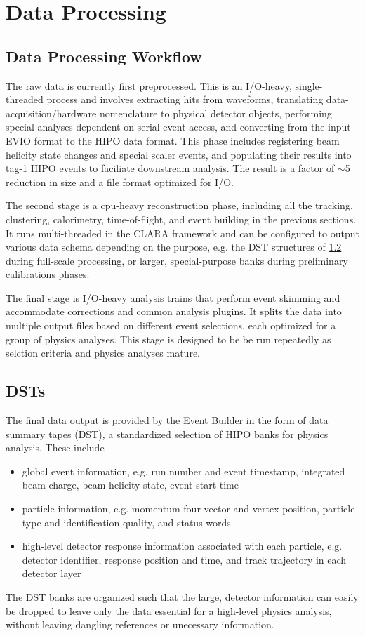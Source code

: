\section{Data Processing}

\subsection{Data Processing Workflow}
The raw data is currently first preprocessed.  This is an I/O-heavy, single-threaded process and involves extracting hits from waveforms, translating data-acquisition/hardware nomenclature to physical detector objects, performing special analyses dependent on serial event access, and converting from the input EVIO format to the HIPO data format.  This phase includes registering beam helicity state changes and special scaler events, and populating their results into tag-1 HIPO events to faciliate downstream analysis.  The result is a factor of $\sim$5 reduction in size and a file format optimized for I/O.

The second stage is a cpu-heavy reconstruction phase, including all the tracking, clustering, calorimetry, time-of-flight, and event building in the previous sections.  It runs multi-threaded in the CLARA framework and can be configured to output various data schema depending on the purpose, e.g. the DST structures of \ref{sec:dsts} during full-scale processing, or larger, special-purpose banks during preliminary calibrations phases.

The final stage is I/O-heavy analysis trains that perform event skimming and accommodate corrections and common analysis plugins.  It splits the data into multiple output files based on different event selections, each optimized for a group of physics analyses.  This stage is designed to be be run repeatedly as selction criteria and physics analyses mature.

\subsection{DSTs}\label{sec:dsts}
The final data output is provided by the Event Builder in the form of data summary tapes (DST), a standardized selection of HIPO banks for physics analysis.  These include
\begin{itemize}
    \item global event information, e.g. run number and event timestamp, integrated beam charge, beam helicity state, event start time
    \item particle information, e.g. momentum four-vector and vertex position, particle type and identification quality, and status words
    \item high-level detector response information associated with each particle, e.g. detector identifier, response position and time, and track trajectory in each detector layer
\end{itemize}
The DST banks are organized such that the large, detector information can easily be dropped to leave only the data essential for a high-level physics analysis, without leaving dangling references or unecessary information.

